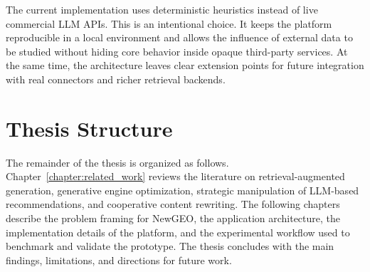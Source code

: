 The current implementation uses deterministic heuristics instead of live commercial LLM APIs.
This is an intentional choice. It keeps the platform reproducible in a local environment and
allows the influence of external data to be studied without hiding core behavior inside opaque
third-party services. At the same time, the architecture leaves clear extension points for future
integration with real connectors and richer retrieval backends.

\section{Thesis Structure}

The remainder of the thesis is organized as follows. Chapter~\ref{chapter:related_work}
reviews the literature on retrieval-augmented generation, generative engine optimization,
strategic manipulation of LLM-based recommendations, and cooperative content rewriting.
The following chapters describe the problem framing for NewGEO, the application
architecture, the implementation details of the platform, and the experimental workflow used
to benchmark and validate the prototype. The thesis concludes with the main findings,
limitations, and directions for future work.
